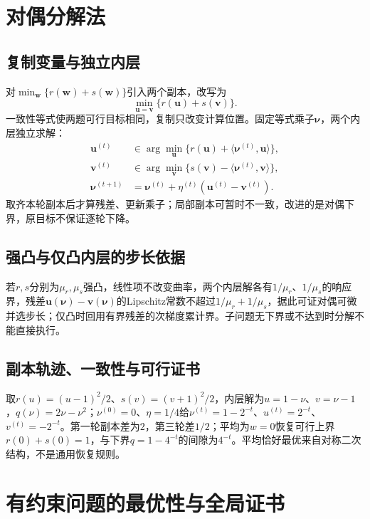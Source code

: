 \section{对偶分解法}

\subsection{复制变量与独立内层}

对$\min_{\bm w}\{r(\bm w)+s(\bm w)\}$引入两个副本，改写为
\[
 \min_{\bm u=\bm v}\{r(\bm u)+s(\bm v)\}.
\]
一致性等式使两题可行目标相同，复制只改变计算位置。固定等式乘子$\bm\nu$，两个内层独立求解：
\begin{equation}
 \begin{aligned}
 \bm u^{(t)}&\in\arg\min_{\bm u}\{r(\bm u)+\langle\bm\nu^{(t)},\bm u\rangle\},\\
 \bm v^{(t)}&\in\arg\min_{\bm v}\{s(\bm v)-\langle\bm\nu^{(t)},\bm v\rangle\},\\
 \bm\nu^{(t+1)}&=\bm\nu^{(t)}+\eta^{(t)}(\bm u^{(t)}-\bm v^{(t)}).
 \end{aligned}
 \label{eq:opt-consensus-dual-decomposition}
\end{equation}
取齐本轮副本后才算残差、更新乘子；局部副本可暂时不一致，改进的是对偶下界，原目标不保证逐轮下降。

\subsection{强凸与仅凸内层的步长依据}

若$r,s$分别为$\mu_r,\mu_s$强凸，线性项不改变曲率，两个内层解各有$1/\mu_r$、$1/\mu_s$的响应界，残差$\bm u(\bm\nu)-\bm v(\bm\nu)$的Lipschitz常数不超过$1/\mu_r+1/\mu_s$，据此可证对偶可微并选步长；仅凸时回用有界残差的次梯度累计界。子问题无下界或不达到时分解不能直接执行。

\subsection{副本轨迹、一致性与可行证书}

取$r(u)=(u-1)^2/2$、$s(v)=(v+1)^2/2$，内层解为$u=1-\nu$、$v=\nu-1$，$q(\nu)=2\nu-\nu^2$；$\nu^{(0)}=0$、$\eta=1/4$给$\nu^{(t)}=1-2^{-t}$、$u^{(t)}=2^{-t}$、$v^{(t)}=-2^{-t}$。第一轮副本差为$2$，第三轮差$1/2$；平均为$w=0$恢复可行上界$r(0)+s(0)=1$，与下界$q=1-4^{-t}$的间隙为$4^{-t}$。平均恰好最优来自对称二次结构，不是通用恢复规则。

\section{有约束问题的最优性与全局证书}

